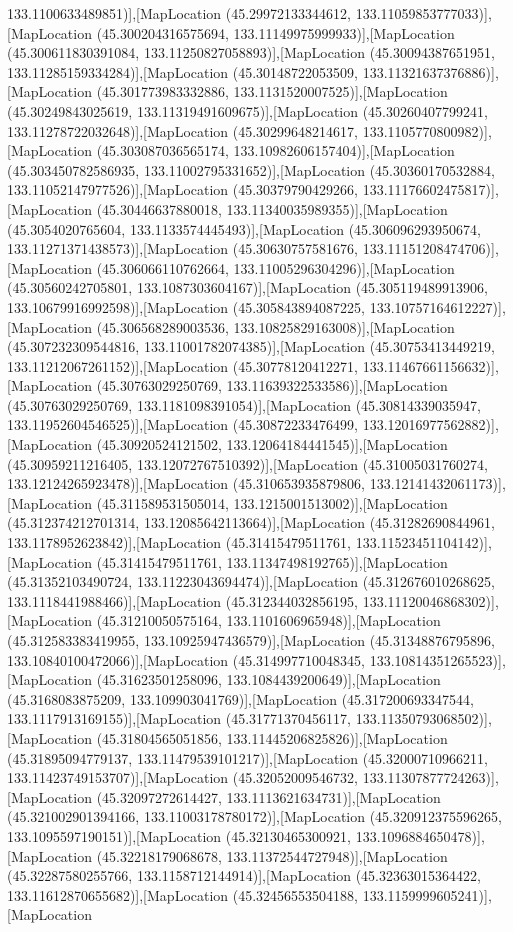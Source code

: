 133.1100633489851)],[MapLocation (45.29972133344612, 133.11059853777033)],[MapLocation (45.300204316575694, 133.11149975999933)],[MapLocation (45.300611830391084, 133.11250827058893)],[MapLocation (45.30094387651951, 133.11285159334284)],[MapLocation (45.30148722053509, 133.11321637376886)],[MapLocation (45.301773983332886, 133.1131520007525)],[MapLocation (45.30249843025619, 133.11319491609675)],[MapLocation (45.30260407799241, 133.11278722032648)],[MapLocation (45.30299648214617, 133.1105770800982)],[MapLocation (45.303087036565174, 133.10982606157404)],[MapLocation (45.303450782586935, 133.11002795331652)],[MapLocation (45.30360170532884, 133.11052147977526)],[MapLocation (45.30379790429266, 133.11176602475817)],[MapLocation (45.30446637880018, 133.11340035989355)],[MapLocation (45.3054020765604, 133.1133574445493)],[MapLocation (45.306096293950674, 133.11271371438573)],[MapLocation (45.30630757581676, 133.11151208474706)],[MapLocation (45.306066110762664, 133.11005296304296)],[MapLocation (45.30560242705801, 133.1087303604167)],[MapLocation (45.305119489913906, 133.10679916992598)],[MapLocation (45.305843894087225, 133.10757164612227)],[MapLocation (45.306568289003536, 133.10825829163008)],[MapLocation (45.307232309544816, 133.11001782074385)],[MapLocation (45.30753413449219, 133.11212067261152)],[MapLocation (45.30778120412271, 133.11467661156632)],[MapLocation (45.30763029250769, 133.11639322533586)],[MapLocation (45.30763029250769, 133.1181098391054)],[MapLocation (45.30814339035947, 133.11952604546525)],[MapLocation (45.30872233476499, 133.12016977562882)],[MapLocation (45.30920524121502, 133.12064184441545)],[MapLocation (45.30959211216405, 133.12072767510392)],[MapLocation (45.31005031760274, 133.12124265923478)],[MapLocation (45.310653935879806, 133.12141432061173)],[MapLocation (45.311589531505014, 133.1215001513002)],[MapLocation (45.312374212701314, 133.12085642113664)],[MapLocation (45.31282690844961, 133.1178952623842)],[MapLocation (45.31415479511761, 133.11523451104142)],[MapLocation (45.31415479511761, 133.11347498192765)],[MapLocation (45.31352103490724, 133.11223043694474)],[MapLocation (45.312676010268625, 133.1118441988466)],[MapLocation (45.312344032856195, 133.11120046868302)],[MapLocation (45.31210050575164, 133.1101606965948)],[MapLocation (45.312583383419955, 133.10925947436579)],[MapLocation (45.31348876795896, 133.10840100472066)],[MapLocation (45.314997710048345, 133.10814351265523)],[MapLocation (45.31623501258096, 133.1084439200649)],[MapLocation (45.3168083875209, 133.109903041769)],[MapLocation (45.317200693347544, 133.1117913169155)],[MapLocation (45.31771370456117, 133.11350793068502)],[MapLocation (45.31804565051856, 133.11445206825826)],[MapLocation (45.31895094779137, 133.11479539101217)],[MapLocation (45.32000710966211, 133.11423749153707)],[MapLocation (45.32052009546732, 133.11307877724263)],[MapLocation (45.32097272614427, 133.1113621634731)],[MapLocation (45.321002901394166, 133.11003178780172)],[MapLocation (45.320912375596265, 133.1095597190151)],[MapLocation (45.32130465300921, 133.1096884650478)],[MapLocation (45.32218179068678, 133.11372544727948)],[MapLocation (45.32287580255766, 133.1158712144914)],[MapLocation (45.32363015364422, 133.11612870655682)],[MapLocation (45.32456553504188, 133.1159999605241)],[MapLocation 